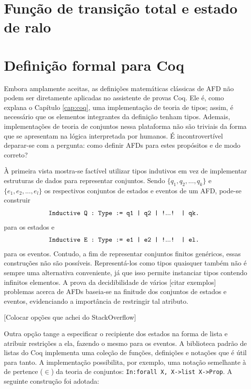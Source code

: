 \section{Função de transição total e estado de ralo}

\section{Definição formal para Coq}

Embora amplamente aceitas, as definições matemáticas clássicas de AFD não podem ser diretamente aplicadas no assistente de provas Coq. Ele é, como explana o Capítulo \ref{cap:coq}, uma implementação de teoria de tipos; assim, é necessário que os elementos integrantes da definição tenham tipos. Ademais, implementações de teoria de conjuntos nessa plataforma não são triviais da forma que se apresentam na lógica interpretada por humanos. É incontrovertível deparar-se com a pergunta: como definir AFDs para estes propósitos e de modo correto?

À primeira vista mostra-se factível utilizar tipos indutivos em vez de implementar estruturas de dados para representar conjuntos. Sendo $\{ q_1, q_2, ..., q_k \}$ e $\{ e_1, e_2, ..., e_l \}$ os respectivos conjuntos de estados e eventos de um AFD, pode-se construir
\begin{equation}\text{\texttt{
Inductive Q : Type := q1 | q2 | !$...$! | qk.
}}\label{eq:Q_inductive}
\end{equation}
para os estados e
\begin{equation}\text{\texttt{
Inductive E : Type := e1 | e2 | !$...$! | el.
}}\label{eq:E_inductive}\end{equation}
para os eventos. Contudo, a fim de representar conjuntos finitos genéricos, essas construções não são possíveis. Representá-los como tipos quaisquer também não é sempre uma alternativa conveniente, já que isso permite instanciar tipos contendo infinitos elementos. A prova da decidibilidade de vários [citar exemplos] problemas acerca de AFDs baseia-se na finitude dos conjuntos de estados e eventos, evidenciando a importância de restringir tal atributo.



[Colocar opções que achei do StackOverflow]

Outra opção tange a especificar o recipiente dos estados na forma de lista e atribuir restrições a ela, fazendo o mesmo para os eventos. A biblioteca padrão de listas do Coq implementa uma coleção de funções, definições e notações que é útil para tanto. A implementação possibilita, por exemplo, uma notação semelhante à de pertence ($\in$) da teoria de conjuntos: \texttt{In:forall X, X->list X->Prop}. A seguinte construção foi adotada:

